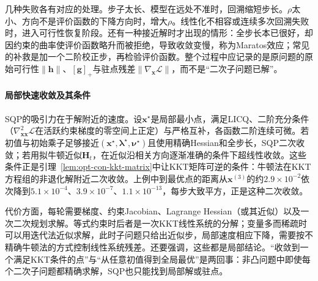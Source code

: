 几种失败各有对应的处理。步子太长、模型在远处不准时，回溯缩短步长。$\rho$太小、方向不是评价函数的下降方向时，增大$\rho$。线性化不相容或连续多次回溯失败时，进入可行性恢复阶段。还有一种接近解时才出现的情形：全步长本已很好，却因约束的曲率使评价函数略升而被拒绝，导致收敛变慢，称为Maratos效应；常见的补救是加一个二阶校正步，再检验评价函数。整个过程中应记录的是原问题的原始可行性$\lVert\bm h\rVert$、$[\bm g]_+$与驻点残差$\lVert\nabla_{\bm x}\mathcal L\rVert$，而不是“二次子问题已解”。

\paragraph{局部快速收敛及其条件}
SQP的吸引力在于解附近的速度。设$\bm x^\star$是局部最小点，满足LICQ、二阶充分条件（$\nabla^2_{\bm x\bm x}\mathcal L$在活跃约束梯度的零空间上正定）与严格互补，各函数二阶连续可微。若初值与初始乘子足够接近$(\bm x^\star,\bm\lambda^\star,\bm\nu^\star)$且使用精确Hessian和全步长，SQP二次收敛；若用拟牛顿近似$\bm H_t$，在近似沿相关方向逐渐准确的条件下超线性收敛。这些条件正是引理~\ref{lem:opt-con-kkt-matrix}中让KKT矩阵可逆的条件：牛顿法在KKT方程组的非退化解附近二次收敛。上例中到最优点的距离从$\bm x^{(3)}$的约$2.9\times10^{-2}$依次降到$5.1\times10^{-4}$、$3.9\times10^{-7}$、$1.1\times10^{-13}$，每步大致平方，正是这种二次收敛。

代价方面，每轮需要梯度、约束Jacobian、Lagrange Hessian（或其近似）以及一次二次规划求解。等式约束时后者是一次KKT线性系统的分解；变量多而稀疏时可以用迭代法近似求解，此时子问题只给出近似步，局部速度相应下降，需要按不精确牛顿法的方式控制线性系统残差。还要强调，这些都是局部结论。“收敛到一个满足KKT条件的点”与“从任意初值得到全局最优”是两回事：非凸问题中即使每个二次子问题都精确求解，SQP也只能找到局部解或驻点。
